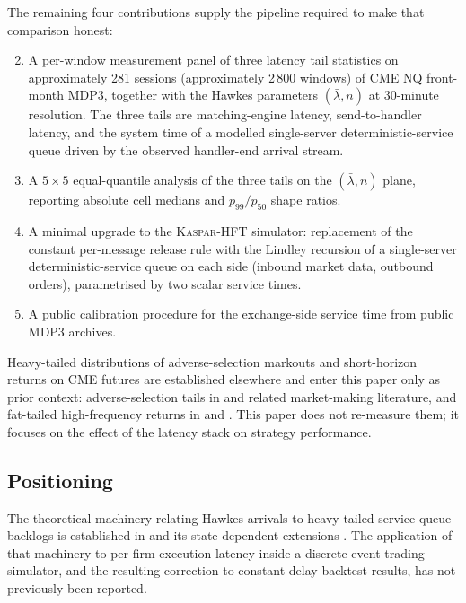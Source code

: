 \documentclass[11pt]{article}
\newcommand{\kasparhft}{\textsc{Kaspar-HFT}}
\begin{document}
The remaining four contributions supply the pipeline required to make that comparison honest:

\begin{enumerate}\setcounter{enumi}{1}
    \item A per-window measurement panel of three latency tail statistics on approximately 281 sessions (approximately 2\,800 windows) of CME NQ front-month MDP3, together with the Hawkes parameters $(\bar\lambda, n)$ at 30-minute resolution. The three tails are matching-engine latency, send-to-handler latency, and the system time of a modelled single-server deterministic-service queue driven by the observed handler-end arrival stream.
    \item A $5 \times 5$ equal-quantile analysis of the three tails on the $(\bar\lambda, n)$ plane, reporting absolute cell medians and $p_{99}/p_{50}$ shape ratios.
    \item A minimal upgrade to the \kasparhft{} simulator: replacement of the constant per-message release rule with the Lindley recursion of a single-server deterministic-service queue on each side (inbound market data, outbound orders), parametrised by two scalar service times.
    \item A public calibration procedure for the exchange-side service time from public MDP3 archives.
\end{enumerate}

Heavy-tailed distributions of adverse-selection markouts and short-horizon returns on CME futures are established elsewhere and enter this paper only as prior context: adverse-selection tails in \citet{carteajaimungalricci2014} and related market-making literature, and fat-tailed high-frequency returns in \citet{bacry2015review} and \citet{hardiman2013}. This paper does not re-measure them; it focuses on the effect of the latency stack on strategy performance.

\subsection{Positioning}
\label{sec:positioning}

The theoretical machinery relating Hawkes arrivals to heavy-tailed service-queue backlogs is established in \citet{dawpender2018queues} and its state-dependent extensions \citep{gaozhu2024statedep,koopsboxmamandjes2018}. The application of that machinery to per-firm execution latency inside a discrete-event trading simulator, and the resulting correction to constant-delay backtest results, has not previously been reported.
\end{document}
